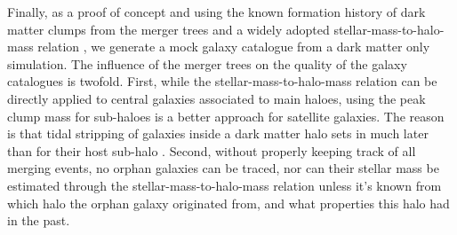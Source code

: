 \documentclass[a4paper,twocolumn,fleqn,usenatbib]{mnras}
\newcommand{\ramses}{\texttt{RAMSES}}
\newcommand{\phew}{\texttt{PHEW}}
\begin{document}

Finally, as a  proof of concept and using the  known formation history
of  dark matter  clumps from  the merger  trees and  a widely  adopted
stellar-mass-to-halo-mass  relation  \citep{Behroozi}, we  generate  a
mock  galaxy  catalogue  from  a dark  matter  only  simulation.   The
influence of the merger trees on  the quality of the galaxy catalogues
is twofold.   First, while the stellar-mass-to-halo-mass  relation can
be directly  applied to  central galaxies  associated to  main haloes,
using the  peak clump  mass for  sub-haloes is  a better  approach for
satellite galaxies.   The reason is  that tidal stripping  of galaxies
inside  a dark  matter halo  sets in  much later  than for  their host
sub-halo \citep{Nagai}.  Second, without properly keeping track of all
merging  events, no  orphan  galaxies  can be  traced,  nor can  their
stellar  mass  be   estimated  through  the  stellar-mass-to-halo-mass
relation  unless  it's  known  from   which  halo  the  orphan  galaxy
originated from, and what properties this halo had in the past.
\end{document}

